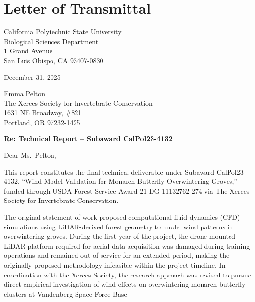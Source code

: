 \section*{Letter of Transmittal}
\thispagestyle{plain}

\begin{singlespace}
\noindent
California Polytechnic State University\\
Biological Sciences Department\\
1 Grand Avenue\\
San Luis Obispo, CA 93407-0830
\end{singlespace}

\vspace{2em}

\noindent December 31, 2025

\vspace{2em}

\begin{singlespace}
\noindent
Emma Pelton\\
The Xerces Society for Invertebrate Conservation\\
1631 NE Broadway, \#821\\
Portland, OR 97232-1425
\end{singlespace}

\vspace{2em}

\noindent\textbf{Re: Technical Report -- Subaward CalPol23-4132}

\vspace{1.5em}

\noindent Dear Ms.\ Pelton,

\vspace{1.5em}

\noindent This report constitutes the final technical deliverable under Subaward CalPol23-4132, ``Wind Model Validation for Monarch Butterfly Overwintering Groves,'' funded through USDA Forest Service Award 21-DG-11132762-274 via The Xerces Society for Invertebrate Conservation.

The original statement of work proposed computational fluid dynamics (CFD) simulations using LiDAR-derived forest geometry to model wind patterns in overwintering groves. During the first year of the project, the drone-mounted LiDAR platform required for aerial data acquisition was damaged during training operations and remained out of service for an extended period, making the originally proposed methodology infeasible within the project timeline. In coordination with the Xerces Society, the research approach was revised to pursue direct empirical investigation of wind effects on overwintering monarch butterfly clusters at Vandenberg Space Force Base.

